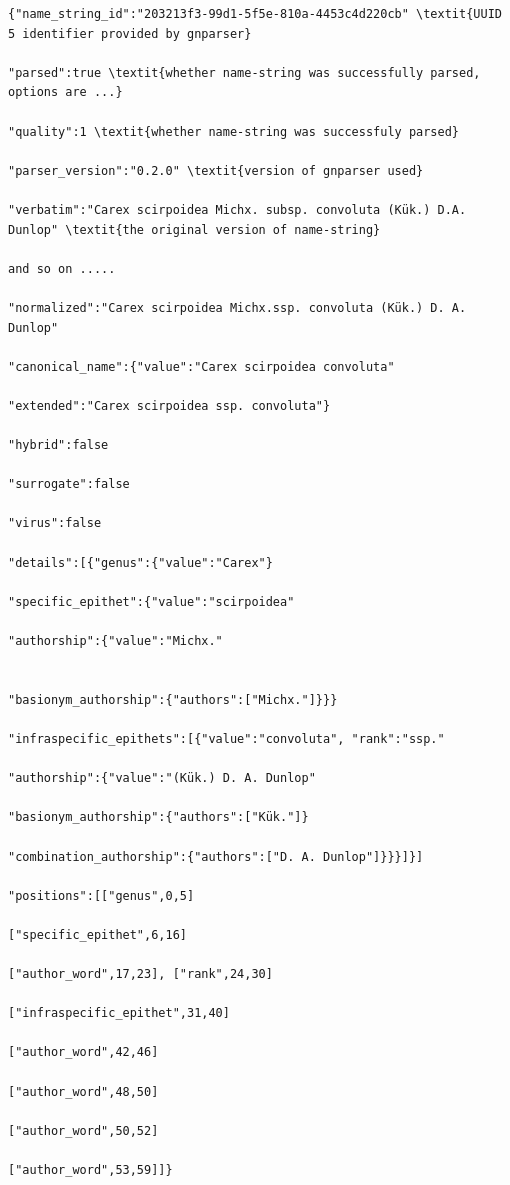 \documentclass{bmcart}
\begin{document}

\begin{Verbatim}[fontsize=\small]
{"name_string_id":"203213f3-99d1-5f5e-810a-4453c4d220cb" \textit{UUID 5 identifier provided by gnparser}

"parsed":true \textit{whether name-string was successfully parsed, options are ...}

"quality":1 \textit{whether name-string was successfuly parsed}

"parser_version":"0.2.0" \textit{version of gnparser used}

"verbatim":"Carex scirpoidea Michx. subsp. convoluta (Kük.) D.A. Dunlop" \textit{the original version of name-string}

and so on .....

"normalized":"Carex scirpoidea Michx.ssp. convoluta (Kük.) D. A. Dunlop"

"canonical_name":{"value":"Carex scirpoidea convoluta"

"extended":"Carex scirpoidea ssp. convoluta"}

"hybrid":false

"surrogate":false

"virus":false

"details":[{"genus":{"value":"Carex"}

"specific_epithet":{"value":"scirpoidea"

"authorship":{"value":"Michx."


"basionym_authorship":{"authors":["Michx."]}}}

"infraspecific_epithets":[{"value":"convoluta", "rank":"ssp."

"authorship":{"value":"(Kük.) D. A. Dunlop"

"basionym_authorship":{"authors":["Kük."]}

"combination_authorship":{"authors":["D. A. Dunlop"]}}}]}]

"positions":[["genus",0,5]

["specific_epithet",6,16]

["author_word",17,23], ["rank",24,30]

["infraspecific_epithet",31,40]

["author_word",42,46]

["author_word",48,50]

["author_word",50,52]

["author_word",53,59]]}
\end{Verbatim}
\end{document}
